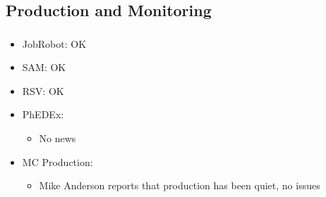 \documentclass{beamer}
\begin{document}
\subsection{Production and Monitoring}
\begin{frame}
\frametitle{}

\begin{itemize}
	\item JobRobot: OK
	\item SAM: OK
	\item RSV: OK
	\item PhEDEx:
	\begin{itemize}
		\item No news
	\end{itemize}
	\item MC Production:
	\begin{itemize}
		\item Mike Anderson reports that production has been quiet, no issues
	\end{itemize}
\end{itemize}
\end{frame}
\end{document}
